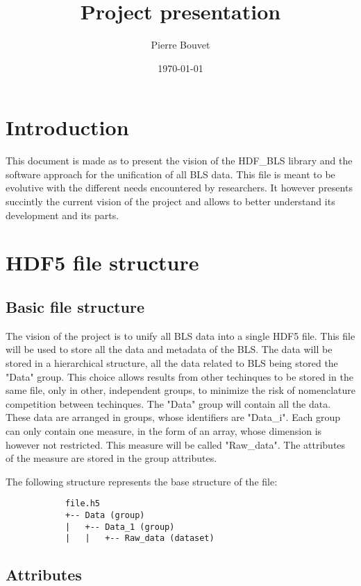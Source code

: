 \documentclass{article}
\title{Project presentation}
\author{Pierre Bouvet}
\date{\today}
\begin{document}
\maketitle


\section{Introduction}
This document is made as to present the vision of the HDF\_BLS library and the software approach for the unification of all BLS data. This file is meant to be evolutive with the different needs encountered by researchers. It however presents succintly the current vision of the project and allows to better understand its development and its parts.

\section{HDF5 file structure}

    \subsection{Basic file structure}
        The vision of the project is to unify all BLS data into a single HDF5 file. This file will be used to store all the data and metadata of the BLS. The data will be stored in a hierarchical structure, all the data related to BLS being stored the "Data" group. This choice allows results from other techinques to be stored in the same file, only in other, independent groups, to minimize the risk of nomenclature competition between techinques. The "Data" group will contain all the data. These data are arranged in groups, whose identifiers are "Data\_i". Each group can only contain one measure, in the form of an array, whose dimension is however not restricted. This measure will be called "Raw\_data". The attributes of the measure are stored in the group attributes.

        The following structure represents the base structure of the file:

        \begin{verbatim}
            file.h5
            +-- Data (group)
            |   +-- Data_1 (group)
            |   |   +-- Raw_data (dataset)
        \end{verbatim}

    \subsection{Attributes}
\end{document}
